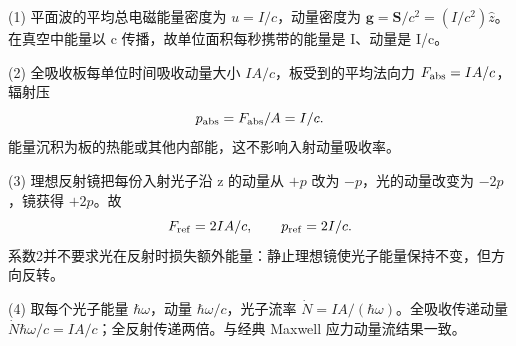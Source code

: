 (1) 平面波的平均总电磁能量密度为 \(u=I/c\)，动量密度为 \(\boldsymbol g=\boldsymbol S/c^2=(I/c^2)\hat z\)。在真空中能量以 c 传播，故单位面积每秒携带的能量是 I、动量是 I/c。

(2) 全吸收板每单位时间吸收动量大小 \(IA/c\)，板受到的平均法向力 \(F_{\rm abs}=IA/c\)，辐射压
\[
p_{\rm abs}=F_{\rm abs}/A=I/c.
\]
能量沉积为板的热能或其他内部能，这不影响入射动量吸收率。

(3) 理想反射镜把每份入射光子沿 z 的动量从 \(+p\) 改为 \(-p\)，光的动量改变为 \(-2p\)，镜获得 \(+2p\)。故
\[
F_{\rm ref}=2IA/c,\qquad p_{\rm ref}=2I/c.
\]
系数2并不要求光在反射时损失额外能量：静止理想镜使光子能量保持不变，但方向反转。

(4) 取每个光子能量 \(\hbar\omega\)，动量 \(\hbar\omega/c\)，光子流率 \(\dot N=IA/(\hbar\omega)\)。全吸收传递动量 \(\dot N\hbar\omega/c=IA/c\)；全反射传递两倍。与经典 Maxwell 应力动量流结果一致。
